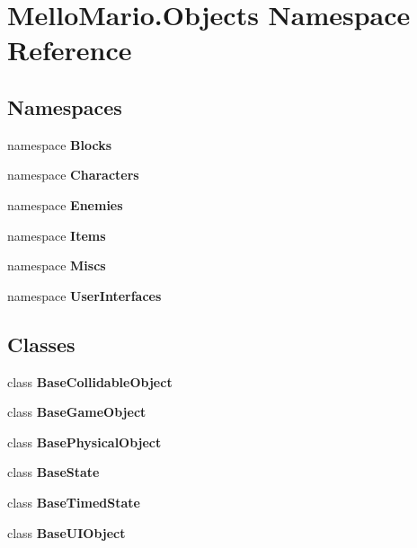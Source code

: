 \section{Mello\+Mario.\+Objects Namespace Reference}
\label{namespaceMelloMario_1_1Objects}
\subsection*{Namespaces}
\begin{DoxyCompactItemize}
\item 
namespace \textbf{ Blocks}
\item 
namespace \textbf{ Characters}
\item 
namespace \textbf{ Enemies}
\item 
namespace \textbf{ Items}
\item 
namespace \textbf{ Miscs}
\item 
namespace \textbf{ User\+Interfaces}
\end{DoxyCompactItemize}
\subsection*{Classes}
\begin{DoxyCompactItemize}
\item 
class \textbf{ Base\+Collidable\+Object}
\item 
class \textbf{ Base\+Game\+Object}
\item 
class \textbf{ Base\+Physical\+Object}
\item 
class \textbf{ Base\+State}
\item 
class \textbf{ Base\+Timed\+State}
\item 
class \textbf{ Base\+U\+I\+Object}
\end{DoxyCompactItemize}
